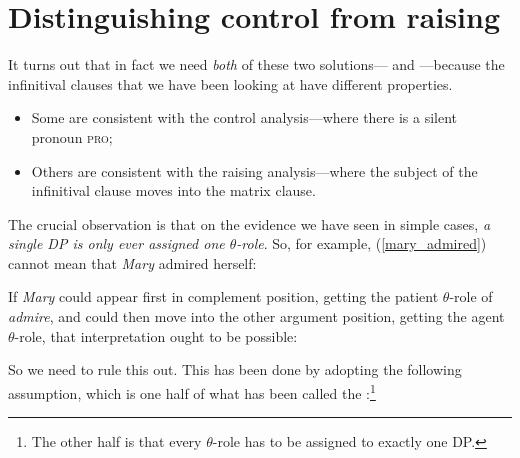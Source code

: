 \documentclass{article}
\begin{document}
\section{Distinguishing control from raising}

It turns out that in fact we need \emph{both} of these two solutions--- and ---because the infinitival clauses that we have been looking at have different properties. 
\begin{itemize}
    \item Some are consistent with the control analysis---where there is a silent pronoun \textsc{pro};
    \item Others are consistent with the raising analysis---where the subject of the infinitival clause moves into the matrix clause.
\end{itemize}
The crucial observation is that on the evidence we have seen in simple cases, \emph{a single DP is only ever assigned one $\theta$-role}.
So, for example, (\ref{mary_admired}) cannot mean that \emph{Mary} admired herself:
\begin{exe}
    \label{mary_admired}
\end{exe}
If \emph{Mary} could appear first in complement position, getting the patient $\theta$-role of \emph{admire}, and could then move into the other argument position, getting the agent $\theta$-role, that interpretation ought to be possible:
\begin{exe}
    \label{mary_admired_mary}
\end{exe}
So we need to rule this out.
This has been done by adopting the following assumption, which is one half of what has been called the :\footnote{The other half is that every $\theta$-role has to be assigned to exactly one DP.}
\begin{exe}
    \label{proto_theta_criterion}
\end{exe}
\end{document}

